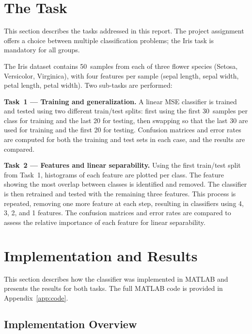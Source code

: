 \documentclass[11pt,a4paper]{article}
\begin{document}
\section{The Task}
\label{sec:task}

This section describes the tasks addressed in this report. The project assignment offers a choice between multiple classification problems; the Iris task is mandatory for all groups.

The Iris dataset contains 50~samples from each of three flower species (Setosa, Versicolor, Virginica), with four features per sample (sepal length, sepal width, petal length, petal width). Two sub-tasks are performed:

\textbf{Task~1 --- Training and generalization.} A linear MSE classifier is trained and tested using two different train/test splits: first using the first 30~samples per class for training and the last 20 for testing, then swapping so that the last 30 are used for training and the first 20 for testing. Confusion matrices and error rates are computed for both the training and test sets in each case, and the results are compared.

\textbf{Task~2 --- Features and linear separability.} Using the first train/test split from Task~1, histograms of each feature are plotted per class. The feature showing the most overlap between classes is identified and removed. The classifier is then retrained and tested with the remaining three features. This process is repeated, removing one more feature at each step, resulting in classifiers using 4, 3, 2, and 1 features. The confusion matrices and error rates are compared to assess the relative importance of each feature for linear separability.

\section{Implementation and Results}
\label{sec:implementation}

This section describes how the classifier was implemented in MATLAB and presents the results for both tasks. The full MATLAB code is provided in Appendix~\ref{app:code}.

\subsection{Implementation Overview}
\end{document}
